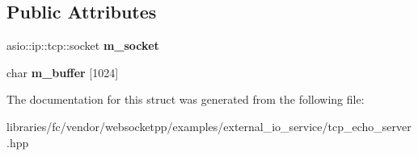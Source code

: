 \subsection*{Public Attributes}
\begin{DoxyCompactItemize}
\item 
\mbox{\label{structtcp__echo__session_a65bed2b4cd943959b667b9b9af0b3507}} 
asio\+::ip\+::tcp\+::socket {\bfseries m\+\_\+socket}
\item 
\mbox{\label{structtcp__echo__session_a380df0af06dbee258b86c3adb979bf8f}} 
char {\bfseries m\+\_\+buffer} \mbox{[}1024\mbox{]}
\end{DoxyCompactItemize}


The documentation for this struct was generated from the following file\+:\begin{DoxyCompactItemize}
\item 
libraries/fc/vendor/websocketpp/examples/external\+\_\+io\+\_\+service/tcp\+\_\+echo\+\_\+server.\+hpp\end{DoxyCompactItemize}
